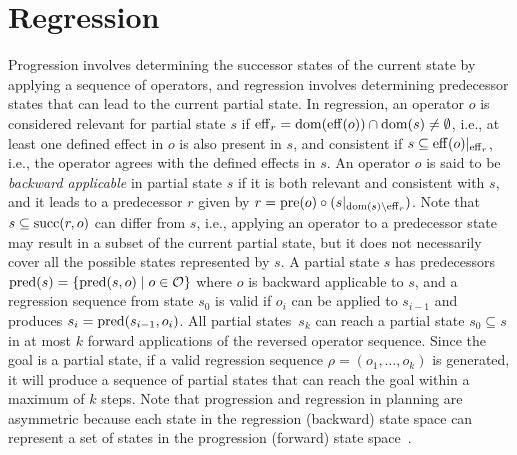 \documentclass[ppgc,diss,english]{iiufrgs}
\begin{document}

\section{Regression}
\label{background-regression}
Progression involves determining the successor states of the current state by applying a sequence of operators, and regression involves determining predecessor states that can lead to the current partial state. In regression, an operator $o$ is considered relevant for partial state $s$ if $\operatorname{eff}_r = \operatorname{dom}(\operatorname{eff}(o)) \cap \operatorname{dom}(s) \neq \emptyset$, i.e., at least one defined effect in $o$ is also present in $s$, and consistent if $s \subseteq \operatorname{eff}(o)|_{\operatorname{eff}_r}$, i.e., the operator agrees with the defined effects in $s$. An operator $o$ is said to be \emph{backward applicable} in partial state $s$ if it is both relevant and consistent with $s$, and it leads to a predecessor $r$ given by $r=\operatorname{pre}(o)\circ (s|_{\operatorname{dom}(s)\setminus\operatorname{eff}_r})$. Note that $s \subseteq \operatorname{succ}(r,o)$ can differ from $s$, i.e., applying an operator to a predecessor state may result in a subset of the current partial state, but it does not necessarily cover all the possible states represented by $s$.
A partial state $s$ has predecessors $\operatorname{pred}(s)=\{{\operatorname{pred}(s,o)\mid o\in \mathcal{O}}\}$ where $o$ is backward applicable to $s$, and a regression sequence from state $s_0$ is valid if $o_i$ can be applied to $s_{i-1}$ and produces $s_i=\operatorname{pred}(s_{i-1},o_i)$. All partial states~$s_k$ can reach a partial state $s_{0} \subseteq s$ in at most $k$ forward applications of the reversed operator sequence.
Since the goal is a partial state, if a valid regression sequence $\rho = (o_1, \ldots, o_k)$ is generated, it will produce a sequence of partial states that can reach the goal within a maximum of $k$ steps.
Note that progression and regression in planning are asymmetric because each state in the regression (backward) state space can represent a set of states in the progression (forward) state space~\cite{Alcazar.etal/2013}.
\end{document}
